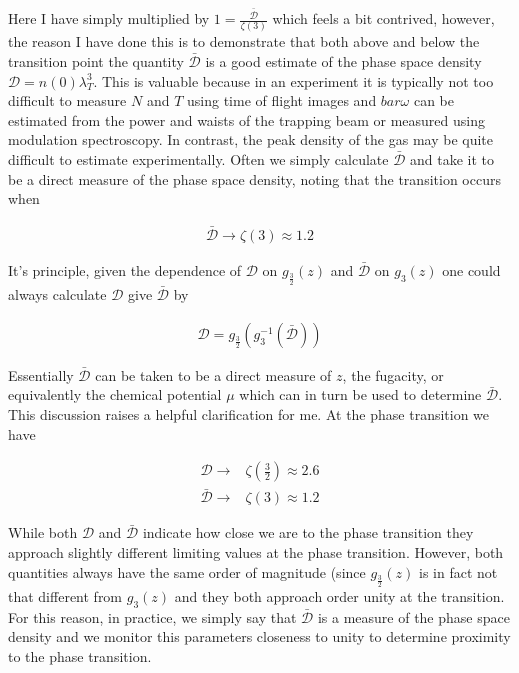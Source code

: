 \documentclass[12pt]{article}
\newcommand{\mc}[1]{\mathcal{#1}}
\begin{document}
Here I have simply multiplied by $1 = \frac{\bar{\mc{D}}}{\zeta(3)}$ which feels a bit contrived, however, the reason I have done this is to demonstrate that both above and below the transition point the quantity $\bar{\mc{D}}$ is a good estimate of the phase space density $\mc{D} = n(0) \lambda_T^3$. 
This is valuable because in an experiment it is typically not too difficult to measure $N$ and $T$ using time of flight images and $bar{\omega}$ can be estimated from the power and waists of the trapping beam or measured using modulation spectroscopy.
In contrast, the peak density of the gas may be quite difficult to estimate experimentally.
Often we simply calculate $\bar{\mc{D}}$ and take it to be a direct measure of the phase space density, noting that the transition occurs when 

\begin{align}
\bar{\mc{D}} \rightarrow \zeta(3) \approx 1.2
\end{align}

It's principle, given the dependence of $\mc{D}$ on $g_{\frac{3}{2}}(z)$ and $\bar{\mc{D}}$ on $g_3(z)$ one could always calculate $\mc{D}$ give $\bar{\mc{D}}$ by

\begin{align}
\mc{D} = g_{\frac{3}{2}}\left(g^{-1}_3\left(\bar{\mc{D}}\right)\right)
\end{align}

Essentially $\bar{\mc{D}}$ can be taken to be a direct measure of $z$, the fugacity, or equivalently the chemical potential $\mu$ which can in turn be used to determine $\bar{\mc{D}}$.
This discussion raises a helpful clarification for me.
At the phase transition we have

\begin{align}
\mc{D} \rightarrow& \zeta\left(\frac{3}{2}\right) \approx 2.6\\
\bar{\mc{D}} \rightarrow& \zeta(3) \approx 1.2
\end{align}

While both $\mc{D}$ and $\bar{\mc{D}}$ indicate how close we are to the phase transition they approach slightly different limiting values at the phase transition.
However, both quantities always have the same order of magnitude (since $g_{\frac{3}{2}}(z)$ is in fact not that different from $g_{3}(z)$ and they both approach order unity at the transition.
For this reason, in practice, we simply say that $\bar{\mc{D}}$ is a measure of the phase space density and we monitor this parameters closeness to unity to determine proximity to the phase transition.
\end{document}
